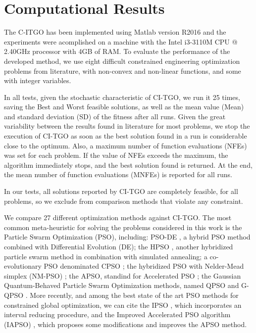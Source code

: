 \section{Computational Results} \label{sec:Results}

The C-ITGO has been implemented using Matlab version R2016 and the experiments were acomplished on a machine with the Intel i3-3110M CPU @ 2.40GHz processor with 4GB of RAM. To evaluate the performance of the developed method, we use eight difficult constrained engineering optimization problems from literature, with non-convex and non-linear functions, and some with integer variables. 

In all tests, given the stochastic characteristic of CI-TGO, we run it 25 times, saving the Best and Worst feasible solutions, as well as the mean value (Mean) and standard deviation (SD) of the fitness after all runs. Given the great variability between the results found in literature for most problems, we stop the execution of CI-TGO as soon as the best solution found in a run is considerable close to the optimum. Also, a maximum number of function evaluations (NFEs) was set for each problem. If the value of NFEs exceeds the maximum, the algorithm immediately stops, and the best solution found is returned. At the end, the mean number of function evaluations (MNFEs) is reported for all runs.

In our tests, all solutions reported by CI-TGO are completely feasible, for all problems, so we exclude from comparison methods that violate any constraint.

We compare 27 different optimization methods against CI-TGO. The most common meta-heuristic for solving the problems considered in this work is the Particle Swarm Optimization (PSO), including: PSO-DE \citep{PSO-DE}, a hybrid PSO method combined with Differential Evolution (DE); the HPSO \citep{HPSO}, another hybridized particle swarm method in combination with simulated annealing; a co-evolutionary PSO denominated CPSO \citep{CPSO}; the hybridized PSO with Nelder-Mead simplex (NM-PSO) \citep{NM-PSO}; the APSO, standind for Accelerated PSO  \citep{APSO}; the Gaussian Quantum-Behaved Particle Swarm Optimization methods, named QPSO and G-QPSO \citep{QPSO}. More recently, and among the best state of the art PSO methods for constrained global optimization, we can cite the IPSO \citep{IPSO}, which incorporates an interval reducing procedure, and the Improved Accelerated PSO algorithm (IAPSO) \citep{IAPSO}, which proposes some modifications and improves the APSO method.


